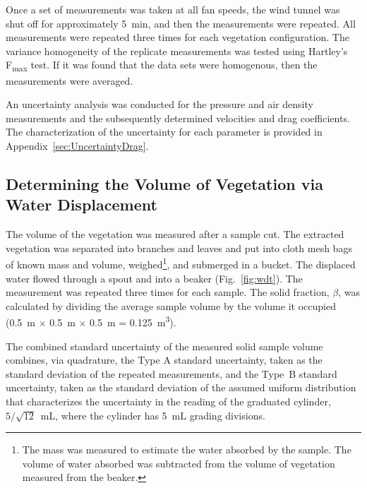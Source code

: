 \documentclass[12pt]{article}
\begin{document}
Once a set of measurements was taken at all fan speeds, the wind tunnel was shut off for approximately 5~\si{min}, and then the measurements were repeated. All measurements were repeated three times for each vegetation configuration. The variance homogeneity of the replicate measurements was tested using Hartley's F\textsubscript{max} test. If it was found that the data sets were homogenous, then the measurements were averaged.

An uncertainty analysis was conducted for the pressure and air density measurements and the subsequently determined velocities and drag coefficients. The characterization of the uncertainty for each parameter is provided in Appendix~\ref{sec:UncertaintyDrag}.

\subsection{Determining the Volume of Vegetation via Water Displacement}
\label{ssec:waterdisp}

The volume of the vegetation was measured after a sample cut. The extracted vegetation was separated into branches and leaves and put into cloth mesh bags of known mass and volume, weighed\footnote{The mass was measured to estimate the water absorbed by the sample. The volume of water absorbed was subtracted from the volume of vegetation measured from the beaker.}, and submerged in a bucket. The displaced water flowed through a spout and into a beaker (Fig.~\ref{fig:wdt}). The measurement was repeated three times for each sample. The solid fraction, $\beta$, was calculated by dividing the average sample volume by the volume it occupied (0.5~\si{m} $\times$ 0.5~\si{m} $\times$ 0.5~\si{m} = 0.125~\si{m^{3}}).

The combined standard uncertainty of the measured solid sample volume combines, via quadrature, the Type A standard uncertainty, taken as the standard deviation of the repeated measurements, and the Type~B standard uncertainty, taken as the standard deviation of the assumed uniform distribution that characterizes the uncertainty in the reading of the graduated cylinder, $5/\sqrt{12}$~mL, where the cylinder has 5~mL grading divisions.
\end{document}
